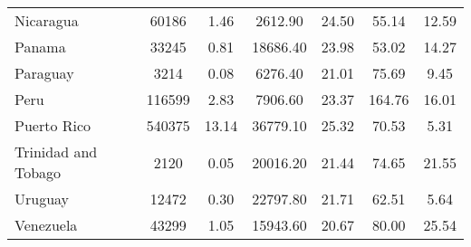 \documentclass[
]{article}
\begin{document}
\begin{landscape}
\begin{table}[ht]
\begin{tabular}{l|cccccc}
  Nicaragua & 60186 & 1.46 & 2612.90 & 24.50 & 55.14 & 12.59 \\ 
  Panama & 33245 & 0.81 & 18686.40 & 23.98 & 53.02 & 14.27 \\ 
  Paraguay & 3214 & 0.08 & 6276.40 & 21.01 & 75.69 & 9.45 \\ 
  Peru & 116599 & 2.83 & 7906.60 & 23.37 & 164.76 & 16.01 \\ 
  Puerto Rico & 540375 & 13.14 & 36779.10 & 25.32 & 70.53 & 5.31 \\ 
  Trinidad and Tobago & 2120 & 0.05 & 20016.20 & 21.44 & 74.65 & 21.55 \\ 
  Uruguay & 12472 & 0.30 & 22797.80 & 21.71 & 62.51 & 5.64 \\ 
  Venezuela & 43299 & 1.05 & 15943.60 & 20.67 & 80.00 & 25.54 \\ 
   \hline
\end{tabular}
\end{table}




\end{landscape}
\end{document}

